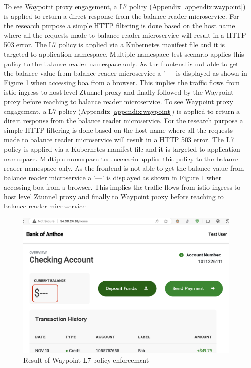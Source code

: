 To see Waypoint proxy engagement, a L7 policy (Appendix \ref{appendix:waypoint}) is applied to return a direct response from the balance reader microservice. For the research purpose a simple HTTP filtering is done based on the host name where all the requests made to balance reader microservice will result in a HTTP 503 error. The L7 policy is applied via a Kubernetes manifest file and it is targeted to application namespace. Multiple namespace test scenario applies this policy to the balance reader namespace only. As the frontend is not able to get the balance value from balance reader microservice a '---' is displayed as shown in Figure \ref{method:l7PolicyAppliedView} when accessing \acrshort{boa} from a browser. This implies the traffic flows from istio ingress to host level Ztunnel proxy and finally followed by the Waypoint proxy before reaching to balance reader microservice.
To see Waypoint proxy engagement, a L7 policy (Appendix \ref{appendix:waypoint}) is applied to return a direct response from the balance reader microservice. For the research purpose a simple HTTP filtering is done based on the host name where all the requests made to balance reader microservice will result in a HTTP 503 error. The L7 policy is applied via a Kubernetes manifest file and it is targeted to application namespace. Multiple namespace test scenario applies this policy to the balance reader namespace only. As the frontend is not able to get the balance value from balance reader microservice a '---' is displayed as shown in Figure \ref{method:l7PolicyAppliedView} when accessing \acrshort{boa} from a browser. This implies the traffic flows from istio ingress to host level Ztunnel proxy and finally to Waypoint proxy before reaching to balance reader microservice.

\begin{figure}[ht!]
  \centering
  \includegraphics[width=0.7\linewidth]{resources/l7-policy-applied.png}
  \caption{Result of Waypoint L7 policy enforcement}
  \label{method:l7PolicyAppliedView}
\end{figure}

